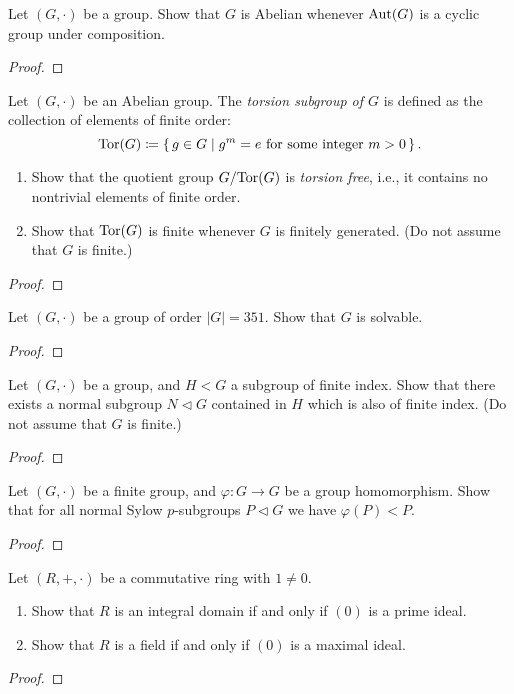 \begin{problem}
Let $(G,\cdot)$  be a group. Show that $G$ is Abelian whenever $\operatorname{Aut}(G)$ is
a cyclic group under composition.
\end{problem}
\begin{proof}
\end{proof}

\begin{problem}
Let $(G,\cdot)$ be an Abelian group. The \emph{torsion subgroup of $G$} is
defined as the collection of elements of finite order:
\[
\operatorname{Tor}(G)\coloneqq
\left\{\,g\in G\;\middle|\;\text{$g^m=e$ for some integer $m>0$}\,\right\}.
\]
\begin{enumerate}[noitemsep,label=(\alph*)]
\item Show that the quotient group $G/{\operatorname{Tor}(G)}$ is \emph{torsion free},
  i.e., it contains no nontrivial elements of finite order.
\item Show that $\operatorname{Tor}(G)$ is finite whenever $G$ is finitely generated. (Do
  not assume that $G$ is finite.)
\end{enumerate}
\end{problem}
\begin{proof}
\end{proof}

\begin{problem}
Let $(G,\cdot)$ be a group of order $|G|=351$. Show that $G$ is solvable.
\end{problem}
\begin{proof}
\end{proof}

\begin{problem}
Let $(G,\cdot)$ be a group, and $H<G$ a subgroup of finite index. Show that
there exists a normal subgroup $N\lhd G$ contained in $H$ which is also of
finite index. (Do not assume that $G$ is finite.)
\end{problem}
\begin{proof}
\end{proof}

\begin{problem}
Let $(G,\cdot)$ be a finite group, and $\varphi\colon G\to G$ be a group
homomorphism. Show that for all normal Sylow $p$-subgroups $P\lhd G$ we
have $\varphi(P)<P$.
\end{problem}
\begin{proof}
\end{proof}

\begin{problem}
Let $(R,+,\cdot)$ be a commutative ring with $1\neq 0$.
\begin{enumerate}[noitemsep,label=(\alph*)]
\item Show that $R$ is an integral domain if and only if $(0)$ is a prime
  ideal.
\item Show that $R$ is a field if and only if $(0)$ is a maximal ideal.
\end{enumerate}
\end{problem}
\begin{proof}
\end{proof}

